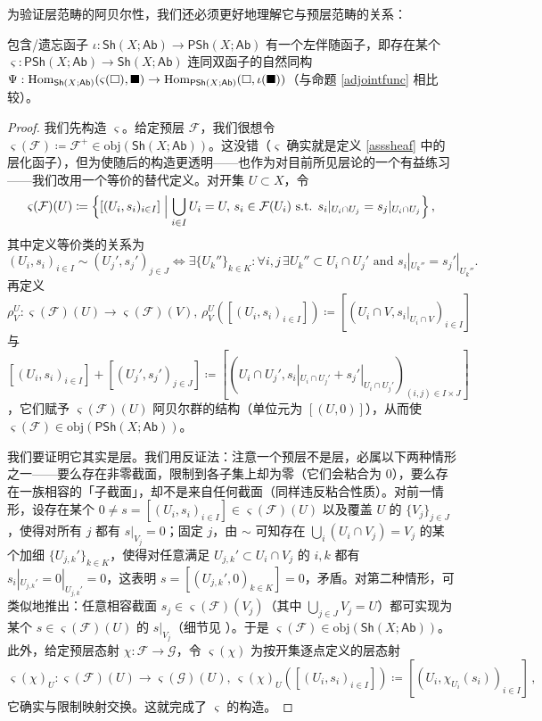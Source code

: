 为验证层范畴的阿贝尔性，我们还必须更好地理解它与预层范畴的关系：

\begin{Pro}\label{biglemma}
包含/遗忘函子 $\iota:\mathsf{Sh}(X;\mathsf{Ab})\rightarrow\mathsf{PSh}(X;\mathsf{Ab})$ 有一个左伴随函子，即存在某个 $\varsigma:\mathsf{PSh}(X;\mathsf{Ab})\rightarrow\mathsf{Sh}(X;\mathsf{Ab})$ 连同双函子的自然同构 $\Psi:\textup{Hom}_{\mathsf{Sh}(X;\mathsf{Ab})}(\varsigma(\square),\blacksquare)\rightarrow\textup{Hom}_{\mathsf{PSh}(X;\mathsf{Ab})}(\square,\iota(\blacksquare))$（与命题 \ref{adjointfunc} 相比较）。
\end{Pro}  

\begin{proof}
我们先构造 $\varsigma$。给定预层 $\mathcal{F}$，我们很想令 $\varsigma(\mathcal{F})\coloneqq\mathcal{F}^+\in\text{obj}(\mathsf{Sh}(X;\mathsf{Ab}))$。这没错（$\varsigma$ 确实就是定义 \ref{asssheaf} 中的层化函子），但为使随后的构造更透明——也作为对目前所见层论的一个有益练习——我们改用一个等价的替代定义。对开集 $U\subset X$，令
\[
\varsigma(\mathcal{F})(U)\coloneqq\Big\{[(U_i, s_i)_{i\in I}] \Bigm| \bigcup_{i\in I}U_i=U,\,s_i\in\mathcal{F}(U_i)\text{ s.t. }s_i|_{U_i\cap U_j}=s_j|_{U_i\cap U_j}\Big\}\,,
\]
其中定义等价类的关系为
\[
(U_i, s_i)_{i\in I}\sim(U_j', s_j')_{j\in J} \Leftrightarrow \exists \{U_k''\}_{k\in K}: \forall i,j\,\exists U_k''\subset U_i\cap U_j'\text{ and } s_i|_{U_k''}=s_j'|_{U_k''}.
\]
再定义 $\rho^U_V:\varsigma(\mathcal{F})(U)\rightarrow\varsigma(\mathcal{F})(V),\,\rho^U_V([(U_i, s_i)_{i\in I}])\coloneqq [(U_i\cap V, s_i|_{U_i\cap V})_{i\in I}]$ 与 $[(U_i, s_i)_{i\in I}] + [(U_j', s_j')_{j\in J}]\coloneqq [(U_i\cap U_j', s_i|_{U_i\cap U_j'} + s_j'|_{U_i\cap U_j'})_{(i,j)\in I\times J}]$，它们赋予 $\varsigma(\mathcal{F})(U)$ 阿贝尔群的结构（单位元为 $[({U},0)]$），从而使 $\varsigma(\mathcal{F})\in\text{obj}(\mathsf{PSh}(X;\mathsf{Ab}))$。

我们要证明它其实是层。我们用反证法：注意一个预层不是层，必属以下两种情形之一——要么存在非零截面，限制到各子集上却为零（它们会粘合为 0），要么存在一族相容的「子截面」，却不是来自任何截面（同样违反粘合性质）。对前一情形，设存在某个 $0\neq s=[(U_i,s_i)_{i\in I}]\in\varsigma(\mathcal{F})(U)$ 以及覆盖 $U$ 的 $\{V_j\}_{j\in J}$，使得对所有 $j$ 都有 $s|_{V_j}=0$；固定 $j$，由 $\sim$ 可知存在 $\bigcup_i(U_i\cap V_j)=V_j$ 的某个加细 $\{U_{j,k}'\}_{k\in K}$，使得对任意满足 $U_{j,k}'\subset U_i\cap V_j$ 的 $i,k$ 都有 $s_i|_{U_{j,k}'}=0|_{U_{j,k}'}=0$，这表明 $s=[(U_{j,k}',0)_{k\in K}]=0$，矛盾。对第二种情形，可类似地推出：任意相容截面 $s_j\in\varsigma(\mathcal{F})(V_j)$（其中 $\bigcup_{j\in J}V_j=U$）都可实现为某个 $s\in\varsigma(\mathcal{F})(U)$ 的 $s|_{V_j}$（细节见 \cite[Proposition II.5.13]{[GM03]}）。于是 $\varsigma(\mathcal{F})\in\text{obj}(\mathsf{Sh}(X;\mathsf{Ab}))$。
此外，给定预层态射 $\chi:\mathcal{F}\rightarrow\mathcal{G}$，令 $\varsigma(\chi)$ 为按开集逐点定义的层态射
\[
\varsigma(\chi)_U:\varsigma(\mathcal{F})(U)\rightarrow\varsigma(\mathcal{G})(U),\,\varsigma(\chi)_U([(U_i, s_i)_{i\in I}])\coloneqq[(U_i, \chi_{U_i}(s_i))_{i\in I}]\,,
\]
它确实与限制映射交换。这就完成了 $\varsigma$ 的构造。


\end{proof}
